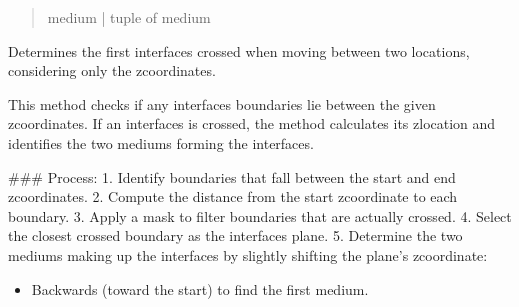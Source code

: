 \documentclass[letterpaper,10pt,english]{sphinxmanual}
\begin{document}
\begin{fulllineitems}
\begin{fulllineitems}
\begin{quote}
\begin{description}
\sphinxAtStartPar
medium | tuple of medium

\sphinxAtStartPar
{}

\end{description}\end{quote}

\end{fulllineitems}


\begin{fulllineitems}
\label{\detokenize{generated/photon_canon.optics:photon_canon.optics.System.interface_crossed}}
\pysigstartsignatures
\pysiglinewithargsret
{}
{\sphinxparamcomma {}}
{}
\pysigstopsignatures
\sphinxAtStartPar
Determines the first interfaces crossed when moving between two locations, considering only the z\sphinxhyphen{}coordinates.

\sphinxAtStartPar
This method checks if any interfaces boundaries lie between the given z\sphinxhyphen{}coordinates. If an interfaces is crossed,
the method calculates its z\sphinxhyphen{}location and identifies the two mediums forming the interfaces.

\sphinxAtStartPar
\#\#\# Process:
1. Identify boundaries that fall between the start and end z\sphinxhyphen{}coordinates.
2. Compute the distance from the start z\sphinxhyphen{}coordinate to each boundary.
3. Apply a mask to filter boundaries that are actually crossed.
4. Select the closest crossed boundary as the interfaces plane.
5. Determine the two mediums making up the interfaces by slightly shifting the plane’s z\sphinxhyphen{}coordinate:
\begin{itemize}
\item {} 
\sphinxAtStartPar
Backwards (toward the start) to find the first medium.


\end{itemize}
\end{fulllineitems}
\end{fulllineitems}
\end{document}
